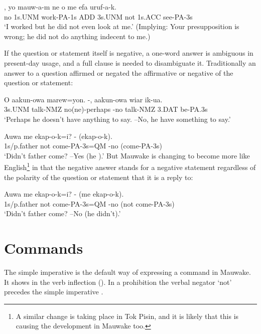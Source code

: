 \ea%
\label{ex:x1224}
\gll {},  yo  mauw-a-m  ne  o  me  efa  uruf-a-k.\\
no  1s.UNM  work-PA-1s  ADD  3s.UNM  not  1s.ACC  see-PA-3s     \\
\glt `I worked but he did not even look at me.' (Implying: Your presupposition is wrong; he did not do anything indecent to me.)
\z

 
If the question or statement itself is negative, a one-word answer is ambiguous in present-day usage, and a full clause is needed to disambiguate it. Traditionally an answer to a question affirmed or negated the affirmative or negative  of the question or statement:

\ea%
\label{ex:x1151}
\gll O  aakun-owa  marew=yon.  -,  aakun-owa  wiar  ik-ua.\\
3s.UNM  talk-NMZ  no(ne)-perhaps  -no  talk-NMZ  3.DAT be-PA.3s     \\
\glt `Perhaps he doesn't have anything to say. --No, he  have something to say.'
\z









\ea%
\label{ex:x1117}
\gll Auwa  me  ekap-o-k=i?  -  (ekap-o-k). \\
 1s/p.father  not  come-PA-3s=QM  -no  (come-PA-3s)     \\
\glt `Didn't father come? --Yes (he ).'
\z
But Mauwake is changing to become more like English\footnote{A similar change is taking place in Tok Pisin, and it is likely that this is causing the development in Mauwake too.} in that the negative answer stands for a negative statement regardless of the polarity of the question or statement that it is a reply to: 

\ea%
\label{ex:x1118}
\gll Auwa  me  ekap-o-k=i?  -  (me  ekap-o-k). \\
 1s/p.father  not  come-PA-3s=QM  -no  (not  come-PA-3s)     \\
\glt `Didn't father come? --No (he didn't).'
\z





\section{Commands}
{}
The simple imperative is the default way of expressing a command in Mauwake. It shows in the verb inflection (). In a prohibition the verbal negator  `not' precedes the simple imperative .

